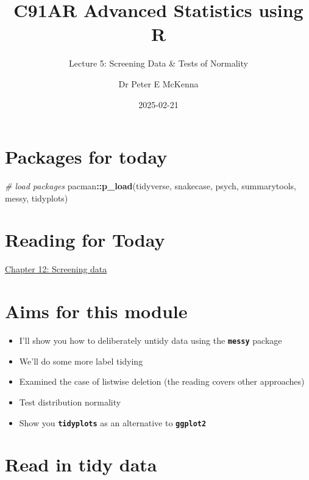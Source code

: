 \documentclass[
]{article}
\title{C91AR \textbar{} Advanced Statistics using R}
\subtitle{Lecture 5: Screening Data \& Tests of Normality}
\author{Dr Peter E McKenna}
\date{2025-02-21}
\newenvironment{Shaded}{\begin{snugshade}}{\end{snugshade}}
\newcommand{\CommentTok}[1]{\textcolor[rgb]{0.56,0.35,0.01}{\textit{#1}}}
\newcommand{\FunctionTok}[1]{\textcolor[rgb]{0.13,0.29,0.53}{\textbf{#1}}}
\newcommand{\NormalTok}[1]{#1}
\newcommand{\SpecialCharTok}[1]{\textcolor[rgb]{0.81,0.36,0.00}{\textbf{#1}}}
\providecommand{\tightlist}{%
  \setlength{\itemsep}{0pt}\setlength{\parskip}{0pt}}
\begin{document}
\maketitle

{
\setcounter{tocdepth}{2}
\tableofcontents
}
\hypertarget{packages-for-today}{%
\section{Packages for today}\label{packages-for-today}}

\begin{Shaded}
\begin{Highlighting}[]
\CommentTok{\# load packages}
\NormalTok{pacman}\SpecialCharTok{::}\FunctionTok{p\_load}\NormalTok{(tidyverse,}
\NormalTok{               snakecase,}
\NormalTok{               psych,}
\NormalTok{               summarytools,}
\NormalTok{               messy,}
\NormalTok{               tidyplots)}
\end{Highlighting}
\end{Shaded}

\hypertarget{reading-for-today}{%
\section{Reading for Today}\label{reading-for-today}}

\href{https://psyteachr.github.io/quant-fun-v2/screening-data.html}{Chapter
12: Screening data}

\hypertarget{aims-for-this-module}{%
\section{Aims for this module}\label{aims-for-this-module}}

\begin{itemize}
\tightlist
\item
  I'll show you how to deliberately untidy data using the
  \textbf{\texttt{messy}} package
\item
  We'll do some more label tidying
\item
  Examined the case of listwise deletion (the reading covers other
  approaches)
\item
  Test distribution normality
\item
  Show you \textbf{\texttt{tidyplots}} as an alternative to
  \textbf{\texttt{ggplot2}}
\end{itemize}

\hypertarget{read-in-tidy-data}{%
\section{Read in tidy data}\label{read-in-tidy-data}}
\end{document}
